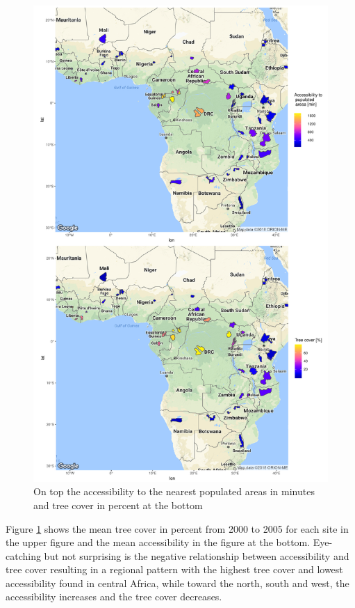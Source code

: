 \begin{center}
	\begin{figure}[H]
		\begin{center}
			\includegraphics[width=14cm]{images/sample_session_1-cropped.pdf}
			\caption{On top the accessibility to the nearest populated areas in minutes and tree cover in percent at the bottom}
			\label{sample_session_1}
		\end{center}
	\end{figure}
\end{center}


Figure \ref{sample_session_1} shows the mean tree cover in percent from 2000 to 2005 for each site in the upper figure and the mean accessibility in the figure at the bottom. Eye-catching but not surprising is the negative relationship between accessibility and tree cover resulting in a regional pattern with the highest tree cover and lowest accessibility found in central Africa, while toward the north, south and west, the accessibility increases and the tree cover decreases.

